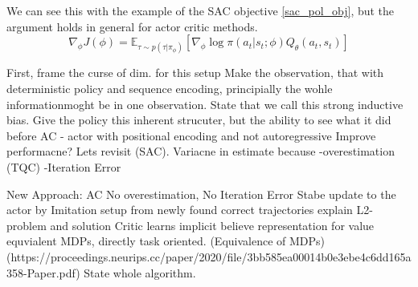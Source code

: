 We can see this with the example of the SAC objective \ref{sac_pol_obj}, but the argument holds in general for actor critic methods.  
\begin{equation}
    \label{AC_general_update}
    \nabla_{\phi} J(\phi) = \mathbb{E}_{\tau \sim p(\tau | \pi_{\phi})} \left[\nabla_{\phi} \log \pi(a_t|s_t;\phi) Q_{\theta}(a_t, s_t) \right]
\end{equation}




First, frame the curse of dim. for this setup
Make the observation, that with deterministic policy and sequence encoding, principially the wohle informationmoght be in one observation.
State that we call this strong inductive bias. 
Give the policy this inherent strucuter, but the ability to see what it did before
AC - actor with positional encoding and not autoregressive
Improve performacne? Lets revisit (SAC).
Variacne in estimate because 
-overestimation (TQC)
-Iteration Error

New Approach: AC
No overestimation, No Iteration Error
Stabe update to the actor by Imitation setup from newly found correct trajectories
explain L2-problem and solution
Critic learns implicit believe representation for value equvialent MDPs, directly task oriented. (Equivalence of MDPs) (https://proceedings.neurips.cc/paper/2020/file/3bb585ea00014b0e3ebe4c6dd165a358-Paper.pdf)
State whole algorithm.